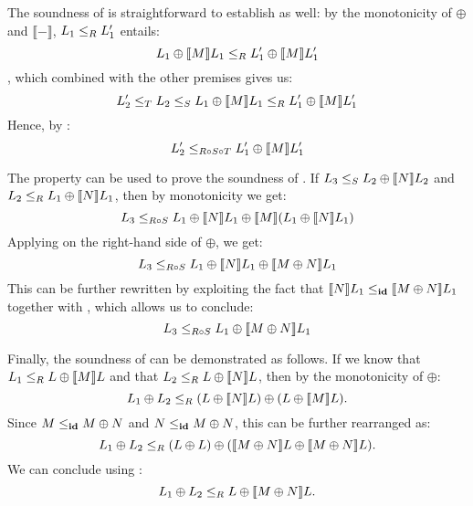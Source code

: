 The soundness of  is
    straightforward to establish as well:
    by the monotonicity of  $\oplus$ and $\llbracket - \rrbracket$,
    $L_1 \le_{R} L_1'$ entails:
    \[ L_1  \oplus \llbracket M \rrbracket L_1 \le_{R}
       L_1' \oplus \llbracket M \rrbracket L_1' \]
    , which combined with the other premises gives us:
    \[ L_2' \le_{T} L_2 \le_{S}
       L_1  \oplus \llbracket M \rrbracket L_1 \le_{R}
       L_1' \oplus \llbracket M \rrbracket L_1' \]
    Hence, by :
    \[ L_2' \le_{R \circ S \circ T} L_1' \oplus \llbracket M \rrbracket L_1' \]

The property  can be used to prove
    the soundness of .
    If $L_3 \le_{S} L_2 \oplus \llbracket N \rrbracket L_2$ and
    $L_2 \le_{R} L_1 \oplus \llbracket N \rrbracket L_1$,
    then by monotonicity we get:
    \[ L_3 \le_{R \circ S} L_1 \oplus \llbracket N \rrbracket L_1 \oplus
      \llbracket M \rrbracket (L_1 \oplus \llbracket N \rrbracket L_1) \]
    Applying 
    on the right-hand side of $\oplus$, we get:
    \[ L_3 \le_{R \circ S} L_1 \oplus \llbracket N \rrbracket L_1
                           \oplus \llbracket M \oplus N \rrbracket L_1 \]
    This can be further rewritten by exploiting the fact that
    $\llbracket N \rrbracket L_1 \le_{\textbf{id}}
     \llbracket M \oplus N \rrbracket L_1$
    together with ,
    which allows us to conclude:
    \[ L_3 \le_{R \circ S} L_1 \oplus \llbracket M \oplus N \rrbracket L_1 \]

Finally, the soundness of  can be demonstrated as follows.
    If we know that $L_1 \le_{R} L \oplus \llbracket M \rrbracket L$
    and that $L_2 \le_{R} L \oplus \llbracket N \rrbracket L$,
    then by the monotonicity of $\oplus$:
    \[ L_1 \oplus L_2 \le_{R} (L \oplus \llbracket N \rrbracket L)
                         \oplus (L \oplus \llbracket M \rrbracket L). \]
    Since $M \le_{\textbf{id}} M \oplus N$
    and $N \le_{\textbf{id}} M \oplus N$,
    this can be further rearranged as:
    \[ L_1 \oplus L_2 \le_{R} (L \oplus L) \oplus
        (\llbracket M \oplus N \rrbracket L \oplus
         \llbracket M \oplus N \rrbracket L). \]
    We can conclude using :
    \[ L_1 \oplus L_2 \le_{R} L \oplus \llbracket M \oplus N \rrbracket L. \]

%
